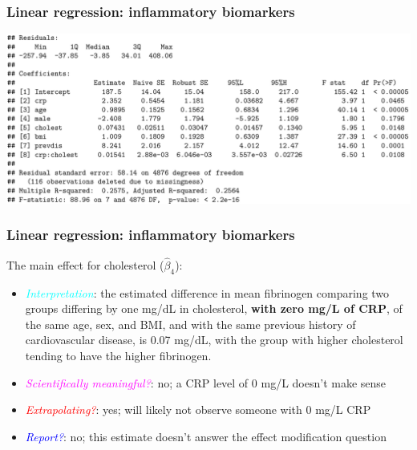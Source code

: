 \documentclass[12pt, 
hyperref={colorlinks=true, linkcolor=blue, urlcolor=cyan},dvipsnames]{beamer}
\begin{document}
\begin{frame}
\frametitle{Linear regression: inflammatory biomarkers}
\hspace*{-0.5cm}\includegraphics[width=1.1\textwidth]{plots/inflamm_fib_vs_crp_em_hidden.png}
\end{frame}

\begin{frame}
\frametitle{Linear regression: inflammatory biomarkers}
The main effect for cholesterol ($\hat{\beta}_4$): \vspace{-0.3cm}
\begin{itemize}
\item \textcolor{cyan}{\textit{Interpretation}}: the estimated difference in mean fibrinogen comparing two groups differing by one mg/dL in cholesterol, \textbf{with zero mg/L of CRP}, of the same age, sex, and BMI, and with the same previous history of cardiovascular disease, is 0.07 mg/dL, with the group with higher cholesterol tending to have the higher fibrinogen.
\item \textcolor{magenta}{\textit{Scientifically meaningful?}}: no; a CRP level of 0 mg/L doesn't make sense
\item \textcolor{red}{\textit{Extrapolating?}}: yes; will likely not observe someone with 0 mg/L CRP
\item \textcolor{blue}{\textit{Report?}}: no; this estimate doesn't answer the effect modification question
\end{itemize}
\end{frame}
\end{document}
